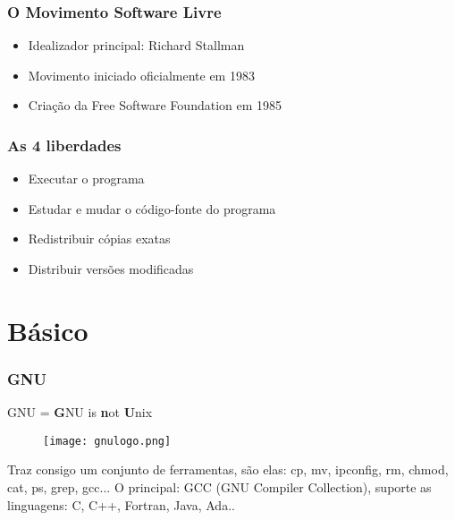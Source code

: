 \documentclass{beamer}
\begin{document}
\begin{frame}
\frametitle{O Movimento Software Livre}
\begin{itemize}
    \item Idealizador principal: Richard Stallman
    \item Movimento iniciado oficialmente em 1983
    \item Criação da Free Software Foundation em 1985
\end{itemize}
\end{frame}

\begin{frame}
\frametitle{As 4 liberdades}
    \begin{itemize}
        \item Executar o programa
        \item Estudar e mudar o código-fonte do programa
        \item Redistribuir cópias exatas
        \item Distribuir versões modificadas
    \end{itemize}
\end{frame}



\section{Básico}

\begin{frame}
    \frametitle{GNU}
    \centerline{GNU = \textbf{G}NU is \textbf{n}ot \textbf{U}nix}

    \begin{figure}
        \texttt{[image: gnulogo.png]}
    \end{figure}

    Traz consigo um conjunto de ferramentas, são elas: cp, mv, ipconfig, rm, chmod, cat, ps, grep, gcc...
    \newline
    \newline
    O principal: GCC (GNU Compiler Collection), suporte as linguagens: C, C++, Fortran, Java, Ada..
\end{frame}
\end{document}
